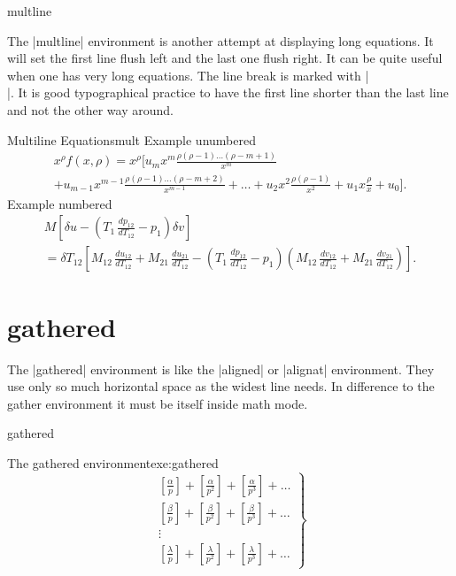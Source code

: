 {{{\begin{docEnvironment}{multline}{}
\end{docEnvironment}
The |multline| environment is another attempt at displaying long equations. It will set the first line flush left and the last one flush right. It can be quite useful when one has very long equations. The line break is marked with |\\|. It is good typographical practice to have the first line shorter than the last line and not the other way around.

\begin{texexample}{Multiline Equations}{mult}
Example unumbered
\begin{multline*}
x^{\rho}f(x, \rho) = x^{\rho} \Big [ u_{m}x^{m}\frac{\rho(\rho-1)\ldots (\rho-m+1)}{x^{m}} \\
                   + u_{m-1}x^{m-1}\frac{\rho(\rho-1)\ldots (\rho-m+2)}{x^{m-1}}+ \ldots
                   + u_{2}x^{2}\frac{\rho(\rho-1)}{x^2}+u_{1}x\frac{\rho}{x}+u_0 \Big ].
\end{multline*}
Example  numbered
\begin{multline}
M \left[\delta u - \left(T_1\, \frac{dp_{12}}{dT_{12}} - p_1\right) \delta v\right] \\
= \delta T_{12} \left[M_{12}\, \frac{du_{12}}{dT_{12}} + M_{21}\, \frac{du_{21}}{dT_{12}}
  - \left(T_1\, \frac{dp_{12}}{dT_{12}} - p_1\right)
    \left(M_{12}\, \frac{dv_{12}}{dT_{12}}
        + M_{21}\, \frac{dv_{21}}{dT_{12}}\right)\right].
\end{multline}
\end{texexample}



\section{gathered}

The |gathered| environment is like the |aligned| or |alignat| environment. They use
only so much horizontal space as the widest line needs. In difference to the gather
environment it must be itself inside math mode.

\begin{docEnvironment}{gathered}{}
\end{docEnvironment}

\begin{texexample}{The gathered environment}{exe:gathered}
\[
  \left .
   \begin{gathered}
    \left [ \frac{\alpha}{p} \right ] +
    \left [ \frac{\alpha}{p^2} \right ] +
    \left [ \frac{\alpha}{p^3} \right ] +
    \ldots \\
    \left [ \frac{\beta}{p} \right ] +
    \left [ \frac{\beta}{p^2} \right ] +
    \left [ \frac{\beta}{p^3} \right ] +
    \ldots \\
      \vdots \\
    \left [ \frac{\lambda}{p} \right ] +
    \left [ \frac{\lambda}{p^2} \right ] +
    \left [ \frac{\lambda}{p^3} \right ] +
    \ldots
   \end{gathered}
  \right \} \tag{B}
\]
\end{texexample}

}}}

